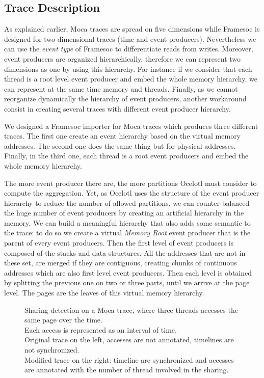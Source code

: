 \subsection{Trace Description}

As explained earlier, \gls{Moca} traces are spread on five dimensions while \gls{Framesoc} is designed for two dimensional traces (time and event producers).
Nevertheless we can use the \emph{event type} of \gls{Framesoc} to differentiate reads from writes.
Moreover, event producers are organized hierarchically, therefore we can represent two dimensions as one by using this hierarchy.
For instance if we consider that each thread is a root level event producer and embed the whole memory hierarchy, we can represent at the same time memory and threads.
Finally, as we cannot reorganize dynamically the hierarchy of event producers, another workaround consist in creating several traces with different event producer hierarchy.

We designed a \gls{Framesoc} importer for \gls{Moca} traces which produces three different traces.
The first one create an event hierarchy based on the virtual memory addresses.
The second one does the same thing but for physical addresses.
Finally, in the third one, each thread is a root event producers and embed the whole memory hierarchy.

The more event producer there are, the more partitions \gls{Ocelotl} must consider to compute the aggregation.
Yet, as \gls{Ocelotl} uses the structure of the event producer hierarchy to reduce the number of allowed partitions, we can counter balanced the huge number of event producers by creating an artificial hierarchy in the memory.
We can build a meaningful hierarchy that also adds some semantic to the trace: to do so we create a virtual \emph{Memory Root} event producer that is the parent of every event producers.
Then the first level of event producers is composed of the stacks and data structures.
All the addresses that are not in these set, are merged if they are contiguous, creating chunks of continuous addresses which are also first level event producers.
Then each level is obtained by splitting the previous one on two or three parts, until we arrive at the page level.
The pages are the leaves of this virtual memory hierarchy.

\begin{figure}[htb]
    \centering
    
    \caption[Sharing detection on Moca traces.]{
        Sharing detection on a Moca trace, where three threads accesses the same page over the time.\\
        Each access is represented as an interval of time.\\
        Original trace on the left, accesses are not annotated, timelines are not synchronized.\\
        Modified trace on the right: timeline are synchronized and accesses are annotated with the number of thread involved in the sharing.
    }
    \label{fig:sharing-detection}
\end{figure}

